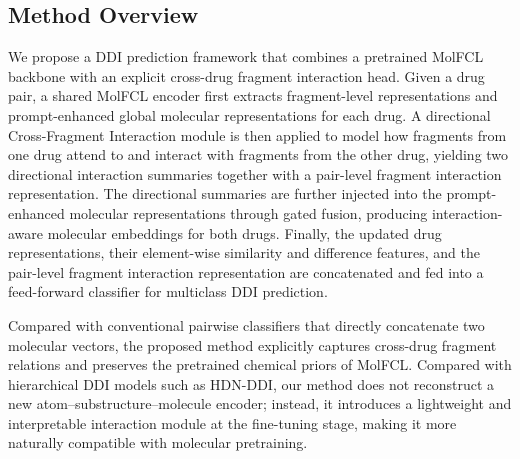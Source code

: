 \subsection{Method Overview}

We propose a DDI prediction framework that combines a pretrained MolFCL backbone with an explicit cross-drug fragment interaction head. Given a drug pair, a shared MolFCL encoder first extracts fragment-level representations and prompt-enhanced global molecular representations for each drug. A directional Cross-Fragment Interaction module is then applied to model how fragments from one drug attend to and interact with fragments from the other drug, yielding two directional interaction summaries together with a pair-level fragment interaction representation. The directional summaries are further injected into the prompt-enhanced molecular representations through gated fusion, producing interaction-aware molecular embeddings for both drugs. Finally, the updated drug representations, their element-wise similarity and difference features, and the pair-level fragment interaction representation are concatenated and fed into a feed-forward classifier for multiclass DDI prediction.

Compared with conventional pairwise classifiers that directly concatenate two molecular vectors, the proposed method explicitly captures cross-drug fragment relations and preserves the pretrained chemical priors of MolFCL. Compared with hierarchical DDI models such as HDN-DDI, our method does not reconstruct a new atom--substructure--molecule encoder; instead, it introduces a lightweight and interpretable interaction module at the fine-tuning stage, making it more naturally compatible with molecular pretraining.
